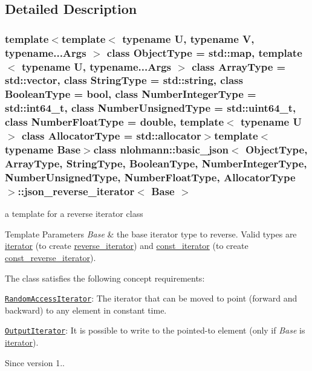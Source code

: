 \subsection{Detailed Description}
\subsubsection*{template$<$template$<$ typename U, typename V, typename...\-Args $>$ class Object\-Type = std\-::map, template$<$ typename U, typename...\-Args $>$ class Array\-Type = std\-::vector, class String\-Type = std\-::string, class Boolean\-Type = bool, class Number\-Integer\-Type = std\-::int64\-\_\-t, class Number\-Unsigned\-Type = std\-::uint64\-\_\-t, class Number\-Float\-Type = double, template$<$ typename U $>$ class Allocator\-Type = std\-::allocator$>$template$<$typename Base$>$class nlohmann\-::basic\-\_\-json$<$ Object\-Type, Array\-Type, String\-Type, Boolean\-Type, Number\-Integer\-Type, Number\-Unsigned\-Type, Number\-Float\-Type, Allocator\-Type $>$\-::json\-\_\-reverse\-\_\-iterator$<$ Base $>$}

a template for a reverse iterator class 


\begin{DoxyTemplParams}{Template Parameters}
{\em Base} & the base iterator type to reverse. Valid types are \hyperlink{classnlohmann_1_1basic__json_1_1iterator}{iterator} (to create \hyperlink{classnlohmann_1_1basic__json_a2f1f83aa187a56dc5ec7a7027065ac8a}{reverse\-\_\-iterator}) and \hyperlink{classnlohmann_1_1basic__json_1_1const__iterator}{const\-\_\-iterator} (to create \hyperlink{classnlohmann_1_1basic__json_ae336fff01f4b78e3e16e5008dc8dbc00}{const\-\_\-reverse\-\_\-iterator}).\\
\hline
\end{DoxyTemplParams}
The class satisfies the following concept requirements\-:
\begin{DoxyItemize}
\item \href{http://en.cppreference.com/w/cpp/concept/RandomAccessIterator}{\tt Random\-Access\-Iterator}\-: The iterator that can be moved to point (forward and backward) to any element in constant time.
\item \href{http://en.cppreference.com/w/cpp/concept/OutputIterator}{\tt Output\-Iterator}\-: It is possible to write to the pointed-\/to element (only if {\itshape Base} is \hyperlink{classnlohmann_1_1basic__json_1_1iterator}{iterator}).
\end{DoxyItemize}

\begin{DoxySince}{Since}
version 1.. 
\end{DoxySince}


